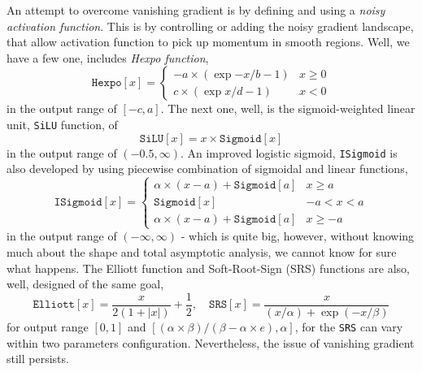 An attempt to overcome vanishing gradient is by defining and using a \textit{noisy activation function}. This is by controlling or adding the noisy gradient landscape, that allow activation function to pick up momentum in smooth regions. Well, we have a few one, includes \textit{Hexpo function}, 
\begin{equation}
    \texttt{Hexpo}[x] = 
    \begin{cases}
        -a \times (\exp{-x/b}-1) & x \geq 0 \\
        c\times (\exp{x/d}-1) & x < 0
    \end{cases}    
\end{equation}
in the output range of $[-c,a]$. The next one, well, is the sigmoid-weighted linear unit, \texttt{SiLU} function, of 
\begin{equation}
    \texttt{SiLU}[x] = x\times \texttt{Sigmoid}[x]
\end{equation}
in the output range of $(-0.5,\infty)$. An improved logistic sigmoid, \texttt{ISigmoid} is also developed by using piecewise combination of sigmoidal and linear functions, 
\begin{equation}
    \texttt{ISigmoid}[x] = \begin{cases}
        \alpha\times (x-a) + \texttt{Sigmoid}[a] & x \geq a \\
        \texttt{Sigmoid}[x] & -a<x < a\\
        \alpha\times (x-a) + \texttt{Sigmoid}[a] & x \geq -a
    \end{cases}
\end{equation}
in the output range of $(-\infty, \infty)$ - which is quite big, however, without knowing much about the shape and total asymptotic analysis, we cannot know for sure what happens. The Elliott function and Soft-Root-Sign (SRS) functions are also, well, designed of the same goal, 
\begin{equation}
    \texttt{Elliott}[x] = \frac{x}{2(1+|x|)}+\frac{1}{2} , \quad \texttt{SRS}[x] = \frac{x}{(x/\alpha)+\exp{(-x/\beta)}}
\end{equation}
for output range $[0,1]$ and $[(\alpha\times\beta)/(\beta-\alpha\times e),\alpha]$, for the \texttt{SRS} can vary within two parameters configuration. Nevertheless, the issue of vanishing gradient still persists. 
